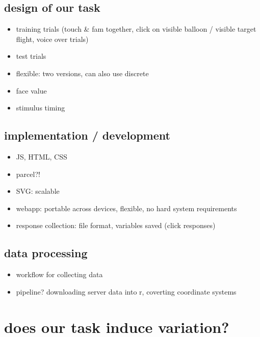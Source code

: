 \documentclass[
  english,
  man,floatsintext]{apa6}
\providecommand{\tightlist}{%
  \setlength{\itemsep}{0pt}\setlength{\parskip}{0pt}}
\begin{document}
\hypertarget{design-of-our-task}{%
\subsection{design of our task}\label{design-of-our-task}}

\begin{itemize}
\item
  training trials (touch \& fam together, click on visible balloon / visible target flight, voice over trials)
\item
  test trials
\item
  flexible: two versions, can also use discrete
\item
  face value
\item
  stimulus timing
\end{itemize}

\hypertarget{implementation-development}{%
\subsection{implementation / development}\label{implementation-development}}

\begin{itemize}
\tightlist
\item
  JS, HTML, CSS
\item
  parcel?!
\item
  SVG: scalable
\item
  webapp: portable across devices, flexible, no hard system requirements
\item
  response collection: file format, variables saved (click responses)
\end{itemize}

\hypertarget{data-processing}{%
\subsection{data processing}\label{data-processing}}

\begin{itemize}
\tightlist
\item
  workflow for collecting data
\item
  pipeline? downloading server data into r, coverting coordinate systems
\end{itemize}

\hypertarget{does-our-task-induce-variation}{%
\section{does our task induce variation?}\label{does-our-task-induce-variation}}
\end{document}
